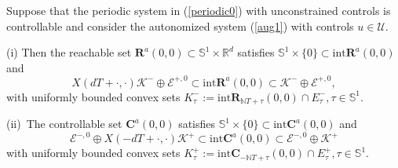 \documentclass{siamltex}%
\begin{document}
\begin{theorem}
\label{Theorem_sub}Suppose that the periodic system in (\ref{periodic0}) with
unconstrained controls is controllable and consider the autonomized system
(\ref{aug1}) with controls $u\in\mathcal{U}$.

(i) Then the reachable set $\mathbf{R}^{a}(0,0)\subset\mathbb{S}^{1}%
\times\mathbb{R}^{d}$ satisfies $\mathbb{S}^{1}\times\{0\}\subset
\mathrm{int}\mathbf{R}^{a}(0,0)$ and%
\[
X(dT+\cdot,\cdot)\mathcal{K}^{-}\oplus\mathcal{E}^{+,0}\subset\mathrm{int}%
\mathbf{R}^{a}(0,0)\subset\mathcal{K}^{-}\oplus\mathcal{E}^{+,0},
\]
with uniformly bounded convex sets $K_{\tau}^{-}:=\mathrm{int}\mathbf{R}%
_{\mathbb{N}T+\tau}(0,0)\cap E_{\tau}^{-},\tau\in\mathbb{S}^{1}$.

(ii)\ The controllable set $\mathbf{C}^{a}(0,0)$ satisfies $\mathbb{S}%
^{1}\times\{0\}\subset\mathrm{int}\mathbf{C}^{a}(0,0)$ and%
\[
\mathcal{E}^{-,0}\oplus X(-dT+\cdot,\cdot)\mathcal{K}^{+}\subset
\mathrm{int}\mathbf{C}^{a}(0,0)\subset\mathcal{E}^{-,0}\oplus\mathcal{K}^{+}%
\]
with uniformly bounded convex sets $K_{\tau}^{+}:=\mathrm{int}\mathbf{C}%
_{-\mathbb{N}T+\tau}(0,0)\cap E_{\tau}^{+},\tau\in\mathbb{S}^{1}$.
\end{theorem}
\end{document}

